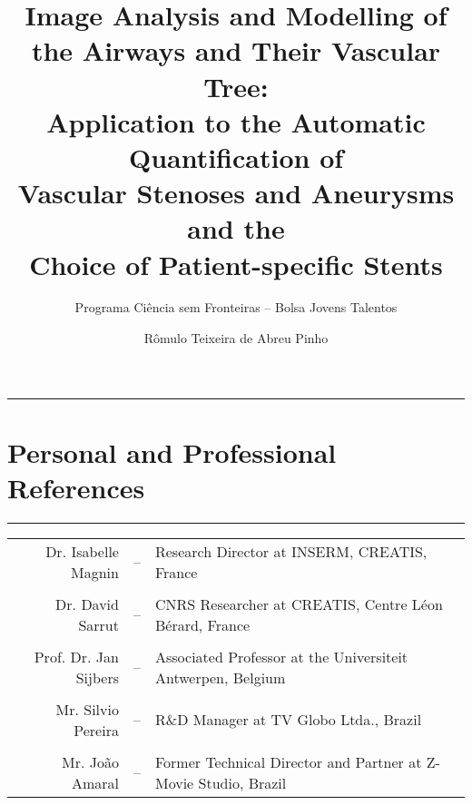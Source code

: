 \documentclass[a4paper]{report}
\title{Image Analysis and Modelling of the Airways and Their Vascular Tree:\\Application to the Automatic Quantification of\\Vascular Stenoses and Aneurysms and the\\Choice of Patient-specific Stents}
\author{Programa Ci\^encia sem Fronteiras -- Bolsa Jovens Talentos}
\date{R\^omulo Teixeira de Abreu Pinho}
\begin{document}
\maketitle



\tableofcontents










\pagebreak

\medskip
\medskip

\hrule
\chapter{Personal and Professional References}
\hrule

\medskip
\medskip

\medskip
\medskip

\begin{center}
\begin{tabular}{r c l}
Dr. Isabelle Magnin & -- & Research Director at INSERM, CREATIS, France\\
\\
Dr. David Sarrut & -- & CNRS Researcher at CREATIS, Centre L\'eon B\'erard, France\\
\\
Prof. Dr. Jan Sijbers & -- & Associated Professor at the Universiteit Antwerpen, Belgium \\
\\
Mr. Silvio Pereira & -- & R\&D Manager at TV Globo Ltda., Brazil \\
\\
Mr. Jo\~ao Amaral & -- & Former Technical Director and Partner at Z-Movie Studio, Brazil \\
\end{tabular}
\end{center}
\vfill







\end{document}
